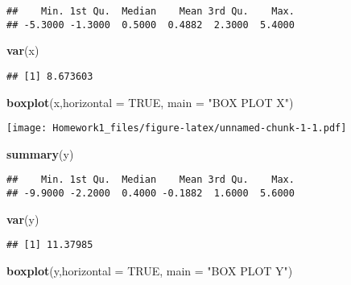 \documentclass[
]{article}
\newenvironment{Shaded}{\begin{snugshade}}{\end{snugshade}}
\newcommand{\AttributeTok}[1]{\textcolor[rgb]{0.13,0.29,0.53}{#1}}
\newcommand{\ConstantTok}[1]{\textcolor[rgb]{0.56,0.35,0.01}{#1}}
\newcommand{\FunctionTok}[1]{\textcolor[rgb]{0.13,0.29,0.53}{\textbf{#1}}}
\newcommand{\NormalTok}[1]{#1}
\newcommand{\StringTok}[1]{\textcolor[rgb]{0.31,0.60,0.02}{#1}}
\begin{document}
\begin{verbatim}
##    Min. 1st Qu.  Median    Mean 3rd Qu.    Max. 
## -5.3000 -1.3000  0.5000  0.4882  2.3000  5.4000
\end{verbatim}

\begin{Shaded}
\begin{Highlighting}[]
\FunctionTok{var}\NormalTok{(x)}
\end{Highlighting}
\end{Shaded}

\begin{verbatim}
## [1] 8.673603
\end{verbatim}

\begin{Shaded}
\begin{Highlighting}[]
\FunctionTok{boxplot}\NormalTok{(x,}\AttributeTok{horizontal =} \ConstantTok{TRUE}\NormalTok{, }\AttributeTok{main =} \StringTok{"BOX PLOT X"}\NormalTok{)}
\end{Highlighting}
\end{Shaded}

\texttt{[image: Homework1\_files/figure-latex/unnamed-chunk-1-1.pdf]}

\begin{Shaded}
\begin{Highlighting}[]
\FunctionTok{summary}\NormalTok{(y)}
\end{Highlighting}
\end{Shaded}

\begin{verbatim}
##    Min. 1st Qu.  Median    Mean 3rd Qu.    Max. 
## -9.9000 -2.2000  0.4000 -0.1882  1.6000  5.6000
\end{verbatim}

\begin{Shaded}
\begin{Highlighting}[]
\FunctionTok{var}\NormalTok{(y)}
\end{Highlighting}
\end{Shaded}

\begin{verbatim}
## [1] 11.37985
\end{verbatim}

\begin{Shaded}
\begin{Highlighting}[]
\FunctionTok{boxplot}\NormalTok{(y,}\AttributeTok{horizontal =} \ConstantTok{TRUE}\NormalTok{, }\AttributeTok{main =} \StringTok{"BOX PLOT Y"}\NormalTok{)}
\end{Highlighting}
\end{Shaded}
\end{document}

